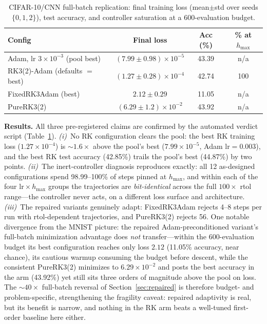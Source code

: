 \documentclass{article}
\begin{document}
\begin{table}[t]
\centering
\caption{CIFAR-10/CNN full-batch replication: final training loss (mean$\pm$std over seeds $\{0,1,2\}$), test accuracy, and controller saturation at a 600-evaluation budget.}
\label{tab:cifar}
\vskip 0.1in
\scriptsize
\setlength{\tabcolsep}{2pt}
\begin{tabular}{lccc}
\toprule
Config & Final loss & Acc (\%) & \% at $h_{\max}$ \\
\midrule
Adam, lr $3{\times}10^{-3}$ (pool best) & $(7.99 \pm 0.98){\times}10^{-5}$ & 43.39 & n/a \\
RK3(2)-Adam (defaults $=$ best) & $(1.27 \pm 0.28){\times}10^{-4}$ & 42.74 & 100 \\
FixedRK3Adam (best) & $2.12 \pm 0.29$ & 11.05 & n/a \\
PureRK3(2) & $(6.29 \pm 1.2){\times}10^{-2}$ & 43.92 & n/a \\
\bottomrule
\end{tabular}
\end{table}

\textbf{Results.} All three pre-registered claims are confirmed by the automated verdict script (Table~\ref{tab:cifar}). \emph{(i)}~No RK configuration clears the pool: the best RK training loss ($1.27\times 10^{-4}$) is ${\sim}1.6\times$ above the pool's best ($7.99\times 10^{-5}$, Adam $\mathrm{lr}{=}0.003$), and the best RK test accuracy (42.85\%) trails the pool's best (44.87\%) by two points. \emph{(ii)}~The inert-controller diagnosis reproduces exactly: all 12 as-designed configurations spend 98.99--100\% of steps pinned at $h_{\max}$, and within each of the four $\mathrm{lr} \times h_{\max}$ groups the trajectories are \emph{bit-identical} across the full $100\times$ rtol range---the controller never acts, on a different loss surface and architecture. \emph{(iii)}~The repaired variants genuinely adapt: FixedRK3Adam rejects 4--8 steps per run with rtol-dependent trajectories, and PureRK3(2) rejects 56. One notable divergence from the MNIST picture: the repaired Adam-preconditioned variant's full-batch minimization advantage does \emph{not} transfer---within the 600-evaluation budget its best configuration reaches only loss $2.12$ (11.05\% accuracy, near chance), its cautious warmup consuming the budget before descent, while the consistent PureRK3(2) minimizes to $6.29\times 10^{-2}$ and posts the best accuracy in the arm (43.92\%) yet still sits three orders of magnitude above the pool on loss. The ${\sim}40\times$ full-batch reversal of Section~\ref{sec:repaired} is therefore budget- and problem-specific, strengthening the fragility caveat: repaired adaptivity is real, but its benefit is narrow, and nothing in the RK arm beats a well-tuned first-order baseline here either.
\end{document}

